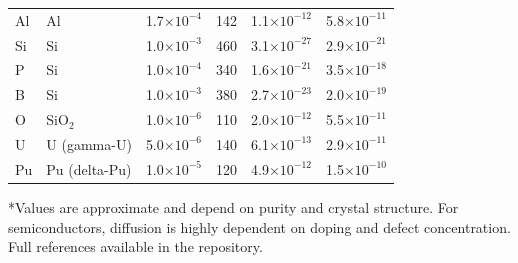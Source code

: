 \documentclass[12pt,a4paper]{article}
\begin{document}
\begin{longtable}{p{1.2cm}p{1.2cm}p{2.0cm}p{2.5cm}p{2.5cm}p{2.5cm}}
		Al & Al & 1.7\(\times10^{-4}\) & 142 & 1.1\(\times10^{-12}\) & 5.8\(\times10^{-11}\) \\
		Si & Si & 1.0\(\times10^{-3}\) & 460 & 3.1\(\times10^{-27}\) & 2.9\(\times10^{-21}\) \\
		P & Si & 1.0\(\times10^{-4}\) & 340 & 1.6\(\times10^{-21}\) & 3.5\(\times10^{-18}\) \\
		B & Si & 1.0\(\times10^{-3}\) & 380 & 2.7\(\times10^{-23}\) & 2.0\(\times10^{-19}\) \\
		O & SiO\(_2\) & 1.0\(\times10^{-6}\) & 110 & 2.0\(\times10^{-12}\) & 5.5\(\times10^{-11}\) \\
		U & U (gamma-U) & 5.0\(\times10^{-6}\) & 140 & 6.1\(\times10^{-13}\) & 2.9\(\times10^{-11}\) \\
		Pu & Pu (delta-Pu) & 1.0\(\times10^{-5}\) & 120 & 4.9\(\times10^{-12}\) & 1.5\(\times10^{-10}\) \\
		\bottomrule
	\end{longtable}
	*Values are approximate and depend on purity and crystal structure. For semiconductors, diffusion is highly dependent on doping and defect concentration. Full references available in the repository.
	
	
\end{document}
